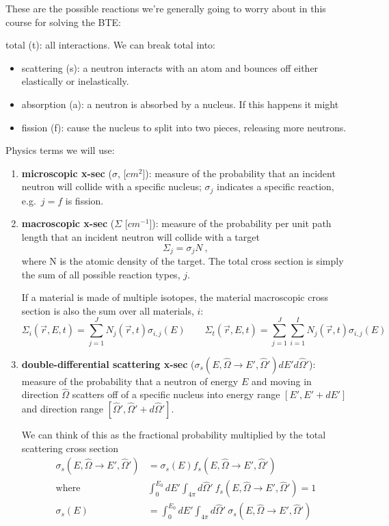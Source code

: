 \documentclass[12pt]{article}
\newcommand{\vOmega}{\ensuremath{\hat{\Omega}}}
\begin{document}
These are the possible reactions we're generally going to worry about in this course for solving the BTE:

\hspace*{1em}total (t): all interactions. We can break total into:
\begin{itemize}
\item scattering (s): a neutron interacts with an atom and bounces off either elastically or inelastically.
\item absorption (a): a neutron is absorbed by a nucleus. If this happens it might
\item fission (f): cause the nucleus to split into two pieces, releasing more neutrons.
\end{itemize}

Physics terms we will use:
\begin{enumerate}
\item \textbf{microscopic x-sec} ($\sigma$, [$cm^2$]): measure of the probability that an incident neutron will collide with a specific nucleus; $\sigma_j$ indicates a specific reaction, e.g.\ $j=f$ is fission.

\item \textbf{macroscopic x-sec} ($\Sigma$ [$cm^{-1}$]): measure of the probability per unit path length that an incident neutron will collide with a target
\[\Sigma_j = \sigma_j N\:,\]
where N is the atomic density of the target. The total cross section is simply the sum of all possible reaction types, $j$. 

If a material is made of multiple isotopes, the material macroscopic cross section is also the sum over all materials, $i$:
\[
\Sigma_i(\vec{r}, E, t) = \sum_{j=1}^J  N_j(\vec{r}, t)\sigma_{i,j}(E)
\qquad
\Sigma_t(\vec{r}, E, t) = \sum_{j=1}^J \sum_{i=1}^I N_j(\vec{r}, t)\sigma_{i,j}(E)
\]

\item \textbf{double-differential scattering x-sec} ($\sigma_s(E, \vOmega \rightarrow E', \vOmega')dE' d\vOmega'$): measure of the probability that a neutron of energy $E$ and moving in direction $\vOmega$ scatters off of a specific nucleus into energy range $[E', E' + dE']$ and direction range $[\vOmega', \vOmega' + d\vOmega']$.

We can think of this as the fractional probability multiplied by the total scattering cross section
\begin{align*}
\sigma_s(E, \vOmega \rightarrow E', \vOmega') &= \sigma_s(E) f_s(E, \vOmega \rightarrow E', \vOmega')\\
\text{where } &\int_0^{E_0} dE' \int_{4 \pi} d\vOmega' \: f_s(E, \vOmega \rightarrow E', \vOmega') = 1\\
\sigma_s(E) &= \int_0^{E_0} dE' \int_{4 \pi} d\vOmega' \:\sigma_s(E, \vOmega \rightarrow E', \vOmega')
\end{align*}


\end{enumerate}
\end{document}
